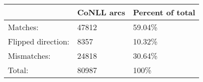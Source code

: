 	\begin{tabular}{|l|l|l|}
		\hline
		 & CoNLL arcs & Percent of total \\ 
		\hline
		Matches: & 47812 & 59.04\%\\ 
		\hline
		Flipped direction: & 8357 & 10.32\%\\ 
		\hline
		Mismatches: & 24818 & 30.64\%\\ 
		\hline
		Total: & 80987 & 100\% \\ 
		\hline
	\end{tabular}
